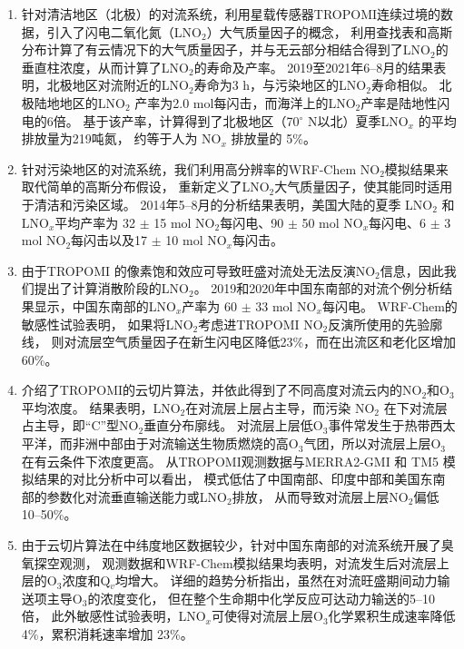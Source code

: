 \begin{enumerate}[label=（\arabic*）, labelindent=\parindent, nosep, leftmargin=0pt, widest=0, itemindent=*, topsep=0pt, partopsep=0pt, parsep=0pt]

\item 针对清洁地区（北极）的对流系统，利用星载传感器TROPOMI连续过境的数据，引入了闪电二氧化氮（LNO$_2$）大气质量因子的概念，
利用查找表和高斯分布计算了有云情况下的大气质量因子，并与无云部分相结合得到了LNO$_2$的垂直柱浓度，从而计算了LNO$_2$的寿命及产率。
2019至2021年6--8月的结果表明，北极地区对流附近的LNO$_2$寿命为3 h，与污染地区的LNO$_2$寿命相似。
北极陆地地区的LNO$_2$ 产率为2.0 mol每闪击，而海洋上的LNO$_2$产率是陆地性闪电的6倍。
基于该产率，计算得到了北极地区（70$^{\circ}$ N以北）夏季LNO$_x$ 的平均排放量为219吨氮，
约等于人为 NO$_x$ 排放量的 5\%。

\item 针对污染地区的对流系统，我们利用高分辨率的WRF-Chem NO$_2$模拟结果来取代简单的高斯分布假设，
重新定义了LNO$_2$大气质量因子，使其能同时适用于清洁和污染区域。
2014年5--8月的分析结果表明，美国大陆的夏季 LNO$_2$ 和 LNO$_x$平均产率为
32 $\pm$ 15 mol NO$_2$每闪电、90 $\pm$ 50 mol NO$_x$每闪电、6 $\pm$ 3 mol NO$_2$每闪击以及17 $\pm$ 10 mol NO$_x$每闪击。

\item 由于TROPOMI 的像素饱和效应可导致旺盛对流处无法反演NO$_2$信息，因此我们提出了计算消散阶段的LNO$_2$。
2019和2020年中国东南部的对流个例分析结果显示，中国东南部的LNO$_x$产率为 60 $\pm$ 33 mol NO$_x$每闪电。
WRF-Chem的敏感性试验表明，
如果将LNO$_2$考虑进TROPOMI NO$_2$反演所使用的先验廓线，
则对流层空气质量因子在新生闪电区降低23\%，而在出流区和老化区增加60\%。

\item 介绍了TROPOMI的云切片算法，并依此得到了不同高度对流云内的NO$_2$和O$_3$平均浓度。
结果表明，LNO$_2$在对流层上层占主导，而污染 NO$_2$ 在下对流层占主导，即“C”型NO$_2$垂直分布廓线。
对流层上层低O$_3$事件常发生于热带西太平洋，而非洲中部由于对流输送生物质燃烧的高O$_3$气团，所以对流层上层O$_3$在有云条件下浓度更高。
从TROPOMI观测数据与MERRA2-GMI 和 TM5 模拟结果的对比分析中可以看出，
模式低估了中国南部、印度中部和美国东南部的参数化对流垂直输送能力或LNO$_2$排放，
从而导致对流层上层NO$_2$偏低10--50\%。

\item 由于云切片算法在中纬度地区数据较少，针对中国东南部的对流系统开展了臭氧探空观测，
观测数据和WRF-Chem模拟结果均表明，对流发生后对流层上层的O$_3$浓度和Q$_v$均增大。
详细的趋势分析指出，虽然在对流旺盛期间动力输送项主导O$_3$的浓度变化，
但在整个生命期中化学反应可达动力输送的5--10倍，
此外敏感性试验表明，LNO$_x$可使得对流层上层O$_3$化学累积生成速率降低 4\%，累积消耗速率增加 23\%。

\end{enumerate}

